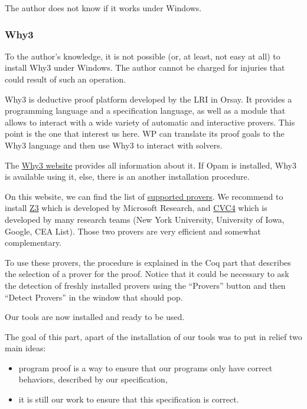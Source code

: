 \documentclass[12pt,francais,]{scrbook}
\providecommand{\tightlist}{%
  \setlength{\itemsep}{0pt}\setlength{\parskip}{0pt}}
\newenvironment{zdsalertblock}[1]{%
  \tcolorbox[beamer,%
    noparskip,breakable,
    colback=LightCoral,colframe=DarkRed,%
    colbacklower=Tomato,%
    title=#1]
}{\endtcolorbox}
\newenvironment{zdsblock}[1]{%
  \tcolorbox[beamer,%
    noparskip,breakable,
    colback=LightBlue,colframe=DarkBlue,%
    colbacklower=DarkBlue,%
    title=#1]
}{\endtcolorbox}
\begin{document}
\begin{zdsblock}{Information}
  The author does not know if it works under Windows.
\end{zdsblock}

\subsubsection{Why3}\label{why3}

\begin{zdsalertblock}{Warning}
  To the author's knowledge, it is not possible (or, at least, not easy
  at all) to install Why3 under Windows. The author cannot be charged for
  injuries that could result of such an operation.
\end{zdsalertblock}
  
Why3 is deductive proof platform developed by the LRI in Orsay. It
provides a programming language and a specification language, as well as
a module that allows to interact with a wide variety of automatic and
interactive provers. This point is the one that interest us here. WP can
translate its proof goals to the Why3 language and then use Why3 to
interact with solvers.

The \href{http://why3.lri.fr/}{Why3 website} provides all information
about it. If Opam is installed, Why3 is available using it, else, there
is an another installation procedure.

On this website, we can find the list of
\href{http://why3.lri.fr/\#provers}{supported provers}. We recommend to
install \href{https://github.com/Z3Prover/z3/wiki}{Z3} which is
developed by Microsoft Research, and
\href{http://cvc4.cs.nyu.edu/web/}{CVC4} which is developed by many
research teams (New York University, University of Iowa, Google, CEA
List). Those two provers are very efficient and somewhat complementary.

To use these provers, the procedure is explained in the Coq part that
describes the selection of a prover for the proof. Notice that it could
be necessary to ask the detection of freshly installed provers using the
``Provers'' button and then ``Detect Provers'' in the window that should
pop.

Our tools are now installed and ready to be used.

The goal of this part, apart of the installation of our tools was to put
in relief two main ideas:

\begin{itemize}
\tightlist
\item
  program proof is a way to ensure that our programs only have correct
  behaviors, described by our specification,
\item
  it is still our work to ensure that this specification is correct.
\end{itemize}
\end{document}
